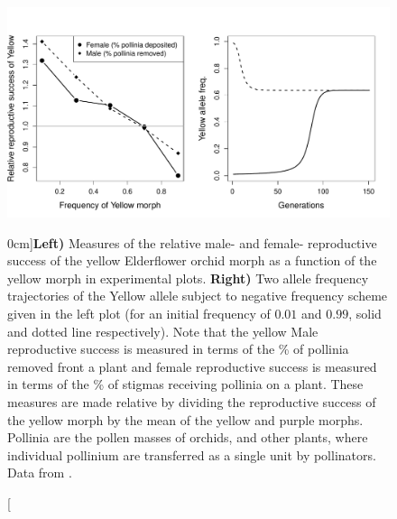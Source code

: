 {\begin{figure}
\begin{center}
  \includegraphics[width = \textwidth]{Journal_figs/single_locus_selection/Elderflower_orchid/Elderflower_orchids_fitness.pdf}
\end{center}
\caption[][0cm]{{\bf Left)} Measures of the relative male- and female- reproductive success of the yellow Elderflower orchid morph
  as a function of the yellow morph in experimental plots. {\bf
    Right)} Two allele frequency trajectories of the Yellow allele
  subject to negative frequency scheme given in the left plot
  (for an initial frequency of $0.01$ and $0.99$, solid and dotted
  line respectively). Note that the yellow 
  Male
  reproductive success is measured in terms of the \% of pollinia
  removed front a plant and female reproductive success is measured in terms of the
  \% of stigmas receiving pollinia on a plant. These measures are made
relative by dividing the reproductive success of the yellow morph by the
mean of the yellow and purple morphs. Pollinia are the pollen masses of
orchids, and other plants, where individual pollinium are transferred
as a single unit by pollinators. Data from
\citet{gigord2001negative}. } \label{fig:Elderflower_orchids_fitness}  
\end{figure}


}
